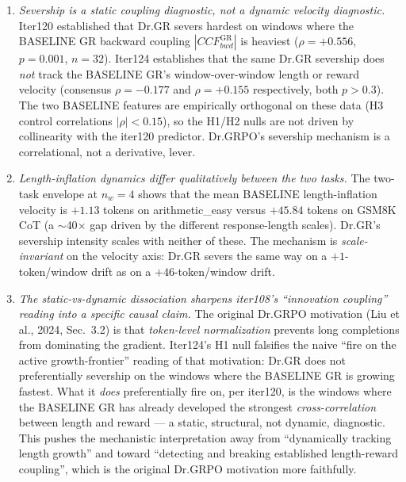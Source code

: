 \begin{enumerate}
\item \emph{Severship is a \emph{static} coupling diagnostic, not a
\emph{dynamic} velocity diagnostic.}  Iter120 established that Dr.GR
severs hardest on windows where the BASELINE GR backward coupling
$|CCF_{bwd}^{\mathrm{GR}}|$ is heaviest ($\rho{=}+0.556$, $p{=}0.001$,
$n{=}32$).  Iter124 establishes that the same Dr.GR severship does
\emph{not} track the BASELINE GR's window-over-window length or
reward velocity (consensus $\rho{=}-0.177$ and $\rho{=}+0.155$
respectively, both $p{>}0.3$).  The two BASELINE features are
empirically orthogonal on these data (H3 control correlations
$|\rho|{<}0.15$), so the H1/H2 nulls are not driven by
collinearity with the iter120 predictor.  Dr.GRPO's severship
mechanism is a correlational, not a derivative, lever.

\item \emph{Length-inflation dynamics differ qualitatively between
the two tasks.}  The two-task envelope at $n_w{=}4$ shows that
the mean BASELINE length-inflation velocity is $+1.13$ tokens on
arithmetic\_easy versus $+45.84$ tokens on GSM8K CoT (a $\sim$40$\times$
gap driven by the different response-length scales).  Dr.GR's
severship intensity scales with neither of these.  The mechanism is
\emph{scale-invariant} on the velocity axis: Dr.GR severs the same
way on a $+1$-token/window drift as on a $+46$-token/window drift.

\item \emph{The static-vs-dynamic dissociation sharpens iter108's
``innovation coupling'' reading into a specific causal claim.}
The original Dr.GRPO motivation (Liu et al., 2024, Sec.~3.2) is that
\emph{token-level normalization} prevents long completions from
dominating the gradient.  Iter124's H1 null falsifies the naive
``fire on the active growth-frontier'' reading of that motivation:
Dr.GR does not preferentially severship on the windows where the
BASELINE GR is growing fastest.  What it \emph{does} preferentially
fire on, per iter120, is the windows where the BASELINE GR has
already developed the strongest \emph{cross-correlation} between
length and reward --- a static, structural, not dynamic,
diagnostic.  This pushes the mechanistic interpretation away from
``dynamically tracking length growth'' and toward
``detecting and breaking established length-reward coupling'',
which is the original Dr.GRPO motivation more faithfully.
\end{enumerate}

